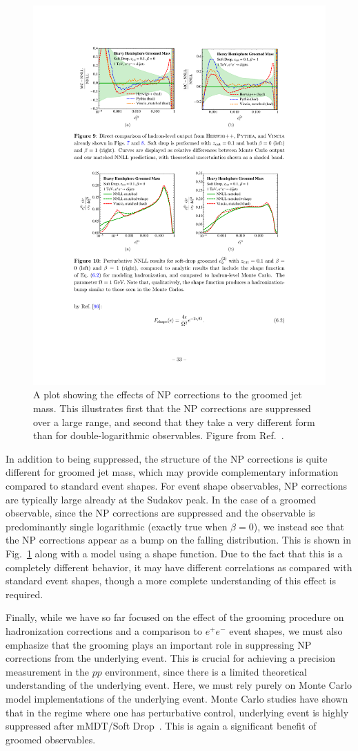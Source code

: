 \documentclass[11pt]{cernrep}
\begin{document}
\begin{figure}[t]
\begin{center}
\includegraphics[width = 0.6\columnwidth]{jetsub_alphas_shape_function.pdf}
\end{center}
\caption{A plot showing the effects of NP corrections to the groomed jet mass. This illustrates first that the NP corrections are suppressed over a large range, and second that they take a very different form than for double-logarithmic observables. Figure from Ref.~\cite{Frye:2016aiz}.}
\label{jetsub_alphas_fig:shape_function}
\end{figure}

In addition to being suppressed, the structure of the NP corrections is quite different for groomed jet mass, which may provide complementary information compared to standard event shapes.
%
For event shape observables, NP corrections are typically large already at the Sudakov peak.
%
In the case of a groomed observable, since the NP corrections are suppressed and the observable is predominantly single logarithmic (exactly true when $\beta=0$), we instead see that the NP corrections appear as a bump on the falling distribution.
%
This is shown in Fig.~\ref{jetsub_alphas_fig:shape_function} along with a model using a shape function.
%
Due to the fact that this is a completely different behavior, it may have different correlations as compared with standard event shapes, though a more complete understanding of this effect is required. 

Finally, while we have so far focused on the effect of the grooming procedure on hadronization corrections and a comparison to $e^+e^-$ event shapes, we must also emphasize that the grooming plays an important role in suppressing NP corrections from the underlying event.
%
This is crucial for achieving a precision measurement in the $pp$ environment, since there is a limited theoretical understanding of the underlying event.
%
Here, we must rely purely on Monte Carlo model implementations of the underlying event.
%
Monte Carlo studies have shown that in the regime where one has perturbative control, underlying event is highly suppressed after mMDT/Soft Drop~\cite{Dasgupta:2013ihk,Larkoski:2014wba}.
%
This is again a significant benefit of groomed observables. 
\end{document}
